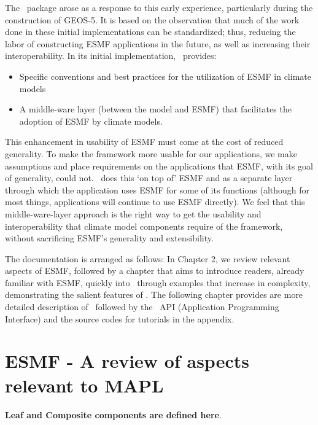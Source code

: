 The \ggn\ package arose as a response to this early
experience, particularly during the construction of GEOS-5.
It is based on the observation that much of the work done in these initial
implementations can be standardized; thus, reducing the labor of
constructing ESMF applications in the future, as well as increasing
their interoperability. In its initial implementation, \ggn\  
provides:
%
\begin{itemize}
\item Specific conventions and best practices for the utilization 
of ESMF in climate models
\item  A middle-ware layer (between the model and ESMF) that
facilitates the adoption of ESMF by climate models.
\end{itemize}

This enhancement in usability of ESMF must come at the cost of reduced
generality. To make the framework more usable for our applications, we
make assumptions and place requirements on the applications that ESMF,
with its goal of generality, could not. \ggn\ does this 
`on top of' ESMF and as a separate layer through which the
application uses ESMF for some of its functions (although for most
things, applications will continue to use ESMF directly). We feel that
this middle-ware-layer approach is the right way to get the usability
and interoperability that climate model components require of the
framework, without sacrificing ESMF's generality and extensibility.

The documentation is arranged as follows: In Chapter 2, we review
relevant aspects of ESMF, followed by a chapter that aims to introduce
readers, already familiar with ESMF, quickly into \ggn\ through examples
that increase in complexity, demonstrating the salient features of \ggn.
The following chapter provides are more detailed description of \ggn\
followed by the \ggn\ API (Application Programming Interface) and the
source codes for tutorials in the appendix.


\chapter{ESMF - A review of aspects relevant to MAPL}
\minitoc

\textbf{Leaf and Composite components are defined here}.


